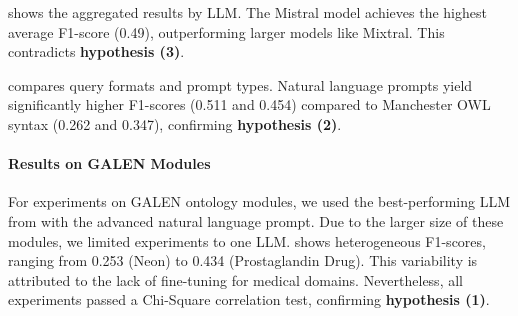 %
 shows the aggregated results by \gls{LLM}.
%
The Mistral model achieves the highest average F1-score (0.49), outperforming larger models like Mixtral.
%
This contradicts \textbf{hypothesis (3)}.

%
 compares query formats and prompt types.
%
Natural language prompts yield significantly higher F1-scores (0.511 and 0.454) compared to Manchester OWL syntax (0.262 and 0.347), confirming \textbf{hypothesis (2)}.

%
\paragraph{Results on GALEN Modules}
\label{par:results-on-galen-modules}
%
For experiments on GALEN ontology modules, we used the best-performing \gls{LLM} from  with the advanced natural language prompt.
%
Due to the larger size of these modules, we limited experiments to one \gls{LLM}.
%
 shows heterogeneous F1-scores, ranging from 0.253 (Neon) to 0.434 (Prostaglandin Drug).
%
This variability is attributed to the lack of fine-tuning for medical domains.
%
Nevertheless, all experiments passed a Chi-Square correlation test, confirming \textbf{hypothesis (1)}.

%
